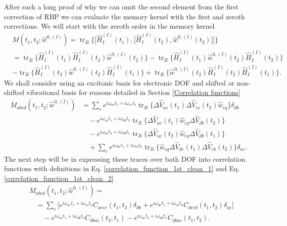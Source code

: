 After such a long proof of why we can omit the second element from the first correction of RBP we can evaluate the memory kernel with the first and zeroth corrections. We will start with the zeroth order in the memory kernel
\begin{equation}
    \begin{aligned}
    &M(t_1, t_2; \hat{w}^{0,(I)}) = \operatorname{tr}_B \Big\{ \Big[\hat{H}_{I}^{(I)}(t_1), \Big[\hat{H}_{I}^{(I)}(t_2), \hat{w}^{0,(I)}(t_2)\Big]\Big]\Big\} \\
    &= \operatorname{tr}_B \Big\{ \hat{H}_{I}^{(I)}(t_1)\hat{H}_{I}^{(I)}(t_2) \hat{w}^{0,(I)}(t_2)\Big\} - \operatorname{tr}_B \Big\{ \hat{H}_{I}^{(I)}(t_1) \hat{w}^{0,(I)}(t_2) \hat{H}_{I}^{(I)}(t_2)\Big\} \\
    &- \operatorname{tr}_B \Big\{ \hat{H}_{I}^{(I)}(t_2) \hat{w}^{0,(I)}(t_2) \hat{H}_{I}^{(I)}(t_1)\Big\} + \operatorname{tr}_B \Big\{ \hat{w}^{0,(I)}(t_2) \hat{H}_{I}^{(I)}(t_2) \hat{H}_{I}^{(I)}(t_1) \Big\}.
    \end{aligned}
\end{equation}
We shall consider using an excitonic basis for electronic DOF and shifted or non-shifted vibrational basis for reasons detailed in Section \ref{Correlation functions}
\begin{equation}
\label{MF_w_0_1}
    \begin{aligned}
    M_{abcd}(t_1, t_2; \hat{w}^{0,(I)}) &= \sum_{e} e^{i\omega_{ae}t_1 + i\omega_{ec}t_2} \operatorname{tr}_B \Big\{ \Delta\hat{V}_{ae}(t_1) \Delta\hat{V}_{ec}(t_2) \hat{w}_{eq} \Big\}\delta_{db} \\
    & \quad - e^{i\omega_{ac}t_1 + i\omega_{db}t_2} \operatorname{tr}_B \Big\{ \Delta\hat{V}_{ac}(t_1) \hat{w}_{eq} \Delta\hat{V}_{db}(t_2) \Big\} \\
    &\quad - e^{i\omega_{ac}t_2 + i\omega_{db}t_1} \operatorname{tr}_B \Big\{ \Delta\hat{V}_{ac}(t_2) \hat{w}_{eq} \Delta\hat{V}_{db}(t_1) \Big\} \\
    & \quad + \sum_{e} e^{i\omega_{de}t_1 + i\omega_{eb}t_2} \operatorname{tr}_B \Big\{ \hat{w}_{eq} \Delta\hat{V}_{de}(t_1) \Delta\hat{V}_{eb}(t_2)  \Big\}\delta_{ac}.
    \end{aligned}
\end{equation}
The next step will be in expressing these traces over bath DOF into correlation functions with definitions in Eq. \ref{correlation_function_1st_clean_1} and Eq. \ref{correlation_function_1st_clean_2}
\begin{equation}
\label{MF_w_0_2}
    \begin{aligned}
    &M_{abcd}(t_1, t_2; \hat{w}^{0,(I)}) = \\
    &\quad=\sum_{e} \Big[ e^{i\omega_{ae}t_1 + i\omega_{ec}t_2} C_{aeec}(t_1, t_2) \delta_{db} +  e^{i\omega_{de}t_1 + i\omega_{eb}t_2} C_{deeb}(t_1, t_2)\delta_{ac} \Big] \\
    & \quad \quad - e^{i\omega_{ac}t_1 + i\omega_{db}t_2}C_{dbac}(t_2, t_1) - e^{i\omega_{ac}t_2 + i\omega_{db}t_1} C_{dbac}(t_1, t_2). \\
    \end{aligned}
\end{equation}
